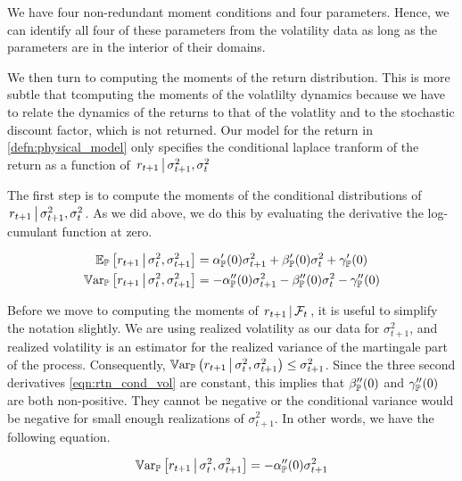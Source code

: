 \documentclass[11pt, letterpaper, twoside, final]{article}
\begin{document}
We have four non-redundant moment conditions and four parameters. 
Hence, we can identify all four of these parameters from the volatility data as long as the parameters are in
the interior of their domains.

We then turn to computing the moments of the return distribution. 
This is more subtle that tcomputing the moments of the volatlilty dynamics because we have to relate the dynamics
of the returns to that of the volatlity and to the stochastic discount factor, which is not returned. 
Our model for the return in \cref{defn:physical_model} only specifies the conditional laplace tranform of the
return as a function of $\left. r_{t+1} \,\middle\vert\, \sigma^2_{t+1}, \sigma^2_t \right.$

The first step is to compute the moments of the conditional distributions of $\left. r_{t+1} \,\middle\vert\,
    \sigma^2_{t+1}, \sigma^2_t \right.$.
As we did above, we do this by evaluating the derivative the log-cumulant function at zero.

\begin{align}
    \operatorname{\mathbb{E}}_{\mathbb{P}}\left[r_{t+1} \,\middle\vert\, \sigma^2_t, \sigma^2_{t+1}\right]  &= \alpha_{\mathbb{P}}'(0) \sigma^2_{t+1}  +
    \beta_{\mathbb{P}}'(0) \sigma^2_t + \gamma_{\mathbb{P}}'(0) \\
    \operatorname{\mathbb{V}ar}_{\mathbb{P}}\left[r_{t+1} \,\middle\vert\, \sigma^2_t, \sigma^2_{t+1}\right]  &= -\alpha_{\mathbb{P}}''(0) \sigma^2_{t+1}  -
    \beta_{\mathbb{P}}''(0) \sigma^2_t - \gamma_{\mathbb{P}}''(0)
    \label{eqn:rtn_cond_vol}
\end{align}


Before we move to computing the moments of $\left. r_{t+1} \,\middle\vert\, \mathcal{F}_t \right.$, it is useful to simplify the
notation slightly.
We are using realized volatility  as our data for $\sigma^2_{t+1}$, and realized volatility is an
estimator for the realized variance of the martingale part of the process.
Consequently, $\operatorname{\mathbb{V}ar}_{\mathbb{P}}\left(r_{t+1} \,\middle\vert\, \sigma^2_t, \sigma^2_{t+1}\right) \leq \sigma^2_{t+1}$.
Since the three second derivatives \cref{eqn:rtn_cond_vol} are constant, this implies that $\beta_{\mathbb{P}}''(0)$ and
$\gamma_{\mathbb{P}}''(0)$ are both non-positive.
They cannot be negative or the conditional variance would be negative for small enough realizations of
$\sigma^2_{t+1}$.
In other words, we have the following equation.

\begin{equation}
    \operatorname{\mathbb{V}ar}_{\mathbb{P}}\left[r_{t+1} \,\middle\vert\, \sigma^2_t, \sigma^2_{t+1}\right]  = -\alpha_{\mathbb{P}}''(0) \sigma^2_{t+1} 
\end{equation}
\end{document}
